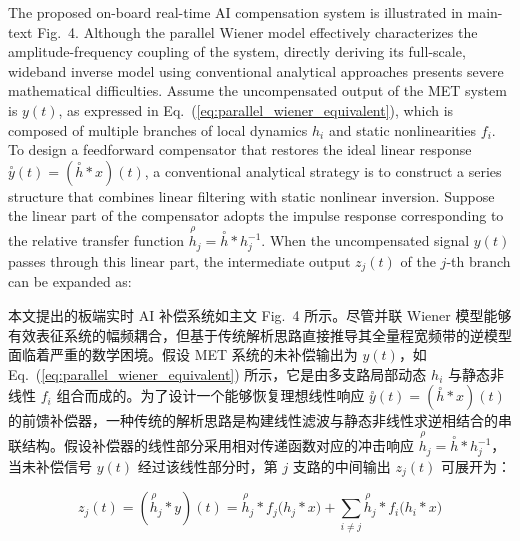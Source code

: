 \documentclass[sn-nature]{sn-jnl}
\newif\ifCNENEnglish
\newif\ifCNENBilingual
\newcommand{\CNEN}[2]{%
    \ifCNENBilingual
        #1%
        \if\relax\detokenize{#2}\relax\else\par #2\fi%
    \else
        \ifCNENEnglish
            #2%
        \else
            #1%
        \fi
    \fi
}
\newcommand{\relative}[1]{\overset{\rho}{#1}} %
\newcommand{\ideal}[1]{\overset{\circ}{#1}} %
\begin{document}
\CNEN{本文提出的板端实时 AI 补偿系统如主文 Fig.~4 所示。尽管并联 Wiener 模型能够有效表征系统的幅频耦合，但基于传统解析思路直接推导其全量程宽频带的逆模型面临着严重的数学困境。假设 MET 系统的未补偿输出为 $y(t)$，如 Eq.~(\ref{eq:parallel_wiener_equivalent}) 所示，它是由多支路局部动态 $h_i$ 与静态非线性 $f_i$ 组合而成的。为了设计一个能够恢复理想线性响应 $\ideal{y}(t) = (\ideal{h} * x)(t)$ 的前馈补偿器，一种传统的解析思路是构建线性滤波与静态非线性求逆相结合的串联结构。假设补偿器的线性部分采用相对传递函数对应的冲击响应 $\relative{h}_j = \ideal{h} * h_j^{-1}$，当未补偿信号 $y(t)$ 经过该线性部分时，第 $j$ 支路的中间输出 $z_j(t)$ 可展开为：}{The proposed on-board real-time AI compensation system is illustrated in main-text Fig.~4. Although the parallel Wiener model effectively characterizes the amplitude-frequency coupling of the system, directly deriving its full-scale, wideband inverse model using conventional analytical approaches presents severe mathematical difficulties. Assume the uncompensated output of the MET system is $y(t)$, as expressed in Eq.~(\ref{eq:parallel_wiener_equivalent}), which is composed of multiple branches of local dynamics $h_i$ and static nonlinearities $f_i$. To design a feedforward compensator that restores the ideal linear response $\ideal{y}(t) = (\ideal{h} * x)(t)$, a conventional analytical strategy is to construct a series structure that combines linear filtering with static nonlinear inversion. Suppose the linear part of the compensator adopts the impulse response corresponding to the relative transfer function $\relative{h}_j = \ideal{h} * h_j^{-1}$. When the uncompensated signal $y(t)$ passes through this linear part, the intermediate output $z_j(t)$ of the $j$-th branch can be expanded as:%
}
\begin{equation}
    z_j(t) = (\relative{h}_j * y)(t) = \relative{h}_j * f_j\big(h_j * x\big) + \sum_{i \neq j} \relative{h}_j * f_i\big(h_i * x\big)
    \label{eq:residual_derivation}
\end{equation}
\end{document}
